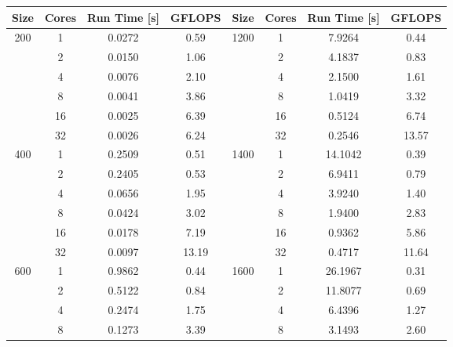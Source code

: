 \begin{tabularx}{\textwidth}{@{} c c c c || c c c c @{}}
\caption{\label{table:multiplication}Matrix multiplication - Run times and FLOPS}\\
\toprule
    \textbf{Size} & \textbf{Cores} & \textbf{Run Time [s]} & \textbf{GFLOPS} & %
    \textbf{Size} & \textbf{Cores} & \textbf{Run Time [s]} & \textbf{GFLOPS}\\
\midrule
\endhead
    \multirow{6}{*}{200} & 1  & 0.0272 & 0.59 & \multirow{6}{*}{1200} & 1  & 7.9264 & 0.44  \\
                         & 2  & 0.0150 & 1.06 &                       & 2  & 4.1837 & 0.83  \\
                         & 4  & 0.0076 & 2.10 &                       & 4  & 2.1500 & 1.61  \\
                         & 8  & 0.0041 & 3.86 &                       & 8  & 1.0419 & 3.32  \\
                         & 16 & 0.0025 & 6.39 &                       & 16 & 0.5124 & 6.74  \\
                         & 32 & 0.0026 & 6.24 &                       & 32 & 0.2546 & 13.57 \\
\midrule
    \multirow{6}{*}{400} & 1  & 0.2509 & 0.51  & \multirow{6}{*}{1400} & 1  & 14.1042 & 0.39  \\
                         & 2  & 0.2405 & 0.53  &                       & 2  & 6.9411  & 0.79  \\
                         & 4  & 0.0656 & 1.95  &                       & 4  & 3.9240  & 1.40  \\
                         & 8  & 0.0424 & 3.02  &                       & 8  & 1.9400  & 2.83  \\
                         & 16 & 0.0178 & 7.19  &                       & 16 & 0.9362  & 5.86  \\
                         & 32 & 0.0097 & 13.19 &                       & 32 & 0.4717  & 11.64 \\
\midrule
    \multirow{6}{*}{600} & 1  & 0.9862 & 0.44  & \multirow{6}{*}{1600} & 1  & 26.1967 & 0.31  \\
                         & 2  & 0.5122 & 0.84  &                       & 2  & 11.8077 & 0.69  \\
                         & 4  & 0.2474 & 1.75  &                       & 4  & 6.4396  & 1.27  \\
                         & 8  & 0.1273 & 3.39  &                       & 8  & 3.1493  & 2.60  \\

\end{tabularx}
